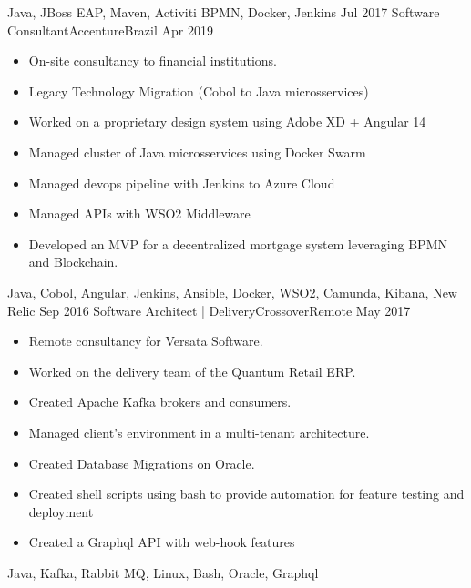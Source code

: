 \begin{experiences}
{                    }
                    {Java, JBoss EAP, Maven, Activiti BPMN, Docker, Jenkins}
  \emptySeparator
  \experience
    {Jul 2017}     {Software Consultant}{Accenture}{Brazil}
    {Apr 2019}    {
                      \begin{itemize}
                        \item On-site consultancy to financial institutions.
                        \item Legacy Technology Migration (Cobol to Java microsservices)
                        \item Worked on a proprietary design system using Adobe XD + Angular 14
                        \item Managed cluster of Java microsservices using Docker Swarm             
                        \item Managed devops pipeline with Jenkins to Azure Cloud
                        \item Managed APIs with WSO2 Middleware          
                        \item Developed an MVP for a decentralized mortgage system leveraging BPMN and Blockchain.
                      \end{itemize}
                    }
                    {Java, Cobol, Angular, Jenkins, Ansible, Docker, WSO2, Camunda, Kibana, New Relic}
  \emptySeparator
  \experience
    {Sep 2016}     {Software Architect | Delivery}{Crossover}{Remote}
    {May 2017}    {
                      \begin{itemize}
                        \item Remote consultancy for Versata Software.
                        \item Worked on the delivery team of the Quantum Retail ERP.
                        \item Created Apache Kafka brokers and consumers.
                        \item Managed client's environment in a multi-tenant architecture.
                        \item Created Database Migrations on Oracle.
                        \item Created shell scripts using bash to provide automation for feature testing and deployment  
                        \item Created a Graphql API with web-hook features
                      \end{itemize}
                    }
                    {Java, Kafka, Rabbit MQ, Linux, Bash, Oracle, Graphql}

\end{experiences}

